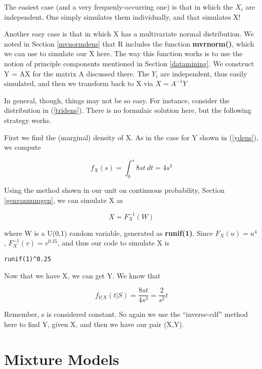 The easiest case (and a very frequenly-occurring one) is that in which
the $X_i$ are independent.  One simply simulates them individually, and
that simulates X!

Another easy case is that in which X has a multivariate normal
distribution.  We noted in Section \ref{mvnormdens} that R includes the
function {\bf mvrnorm()}, which we can use to simulate our X here.  The
way this function works is to use the notion of principle components
mentioned in Section \ref{datamining}.  We construct Y = AX for the
matrix A discussed there.  The $Y_i$ are independent, thus easily
simulated, and then we transform back to X via $X = A^{-1}Y$

In general, though, things may not be so easy.  For instance, consider
the distribution in (\ref{tridens}).  There is no formulaic solution
here, but the following strategy works.  

First we find the (marginal) density of X.  As in the case for Y shown
in (\ref{ydens}), we compute

\begin{equation}
f_X(s) = \int_{0}^{s} 8st ~ dt = 4s^3
\end{equation}

Using the method shown in our unit on continuous probability, Section
\ref{genrannumgen}, we can simulate X as

\begin{equation}
X = F_X^{-1}(W)
\end{equation}

where W is a U(0,1) random variable, generated as {\bf runif(1)}.
Since $F_X(u) = u^4$, $F_X^{-1}(v) = v^{0.25}$, and thus our code to
simulate X is

\begin{Verbatim}[fontsize=\relsize{-2}]
runif(1)^0.25
\end{Verbatim}

Now that we have X, we can get Y.  We know that 

\begin{equation}
f_{Y|X}(t|S) = \frac{8st}{4s^3} = \frac{2}{s^2} t
\end{equation}

Remember, s is considered constant.  So again we use the ``inverse-cdf''
method here to find Y, given X, and then we have our pair (X,Y).

\section{Mixture Models}
\label{mix}

